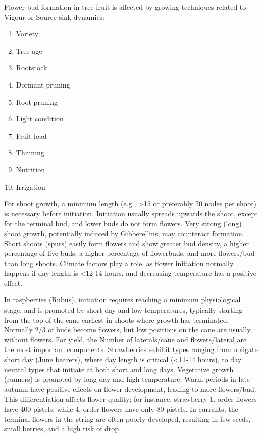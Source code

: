 \vspace{0.5em}
Flower bud formation in tree fruit is affected by growing techniques related to Vigour or Source-sink dynamics: 

\begin{enumerate} 
    \item Variety 
    \item Tree age 
    \item Rootstock 
    \item Dormant pruning 
    \item Root pruning 
    \item Light condition 
    \item Fruit load 
    \item Thinning 
    \item Nutrition 
    \item Irrigation 
\end{enumerate} 

\vspace{0.5em}
For shoot growth, a minimum length (e.g., >15 or preferably 20 nodes per shoot) is necessary before initiation. Initiation usually spreads upwards the shoot, except for the terminal bud, and lower buds do not form flowers. Very strong (long) shoot growth, potentially induced by Gibberellins, may counteract formation. Short shoots (spurs) easily form flowers and show greater bud density, a higher percentage of live buds, a higher percentage of flowerbuds, and more flowers/bud than long shoots. Climate factors play a role, as flower initiation normally happens if day length is <12-14 hours, and decreasing temperature has a positive effect.

\vspace{0.5em}
In raspberries (Rubus), initiation requires reaching a minimum physiological stage, and is promoted by short day and low temperatures, typically starting from the top of the cane earliest in shoots where growth has terminated. Normally 2/3 of buds become flowers, but low positions on the cane are usually without flowers. For yield, the Number of laterals/cane and flowers/lateral are the most important components. Strawberries exhibit types ranging from obligate short day (June bearers), where day length is critical (<11-14 hours), to day neutral types that initiate at both short and long days. Vegetative growth (runners) is promoted by long day and high temperature. Warm periods in late autumn have positive effects on flower development, leading to more flowers/bud. This differentiation affects flower quality; for instance, strawberry 1. order flowers have 400 pistels, while 4. order flowers have only 80 pistels. In currants, the terminal flowers in the string are often poorly developed, resulting in few seeds, small berries, and a high risk of drop.

